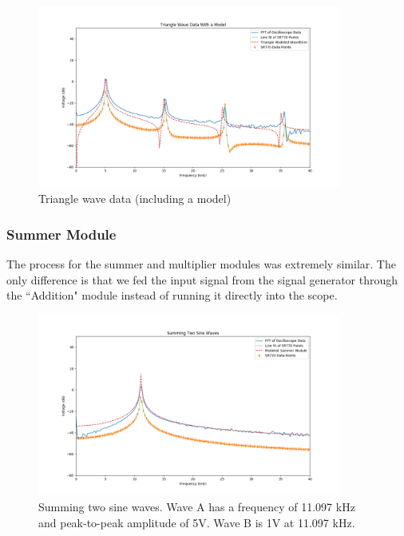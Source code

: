 \documentclass{article}
\begin{document}
\begin{figure}[H]
    \centering
\begin{minipage}{11cm}
\begin{tcolorbox}
    \centering
        \includegraphics[width=10cm, height=6cm]{figures/figure9.png}
        \caption{Triangle wave data (including a model)}
        \label{fig:fig9}
\end{tcolorbox}
\end{minipage}
\end{figure}

\subsubsection{Summer Module}%
The process for the summer and multiplier modules was extremely similar. The
only difference is that we fed the input signal from the signal generator
through the ``Addition" module instead of running it directly into the scope.

\begin{figure}[H]
    \centering
\begin{minipage}{11cm}
\begin{tcolorbox}
    \centering
        \includegraphics[width=10cm, height=6cm]{figures/figure10.png}
        \caption{Summing two sine waves. Wave A has a frequency of 11.097 kHz
        and peak-to-peak amplitude of 5V. Wave B is 1V at 11.097 kHz.}
        \label{fig:fig10}
\end{tcolorbox}
\end{minipage}
\end{figure}
\end{document}
